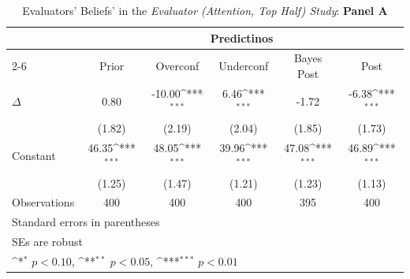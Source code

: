 \begin{table}[htbp]\centering
\def\sym#1{\ifmmode^{#1}\else\(^{#1}\)\fi}
\caption{Evaluators' Beliefs' in the \textit{Evaluator (Attention, Top Half) Study}: \textbf{Panel A}}
\begin{tabular}{l*{5}{c}}
\hline\hline
                &\multicolumn{5}{c}{Predictinos}                                                               \\\cmidrule(lr){2-6}
                &\multicolumn{1}{c}{Prior}&\multicolumn{1}{c}{Overconf}&\multicolumn{1}{c}{Underconf}&\multicolumn{1}{c}{Bayes Post}&\multicolumn{1}{c}{Post}\\
\hline
$\Delta$        &     0.80         &   -10.00\sym{***}&     6.46\sym{***}&    -1.72         &    -6.38\sym{***}\\
                &   (1.82)         &   (2.19)         &   (2.04)         &   (1.85)         &   (1.73)         \\
Constant        &    46.35\sym{***}&    48.05\sym{***}&    39.96\sym{***}&    47.08\sym{***}&    46.89\sym{***}\\
                &   (1.25)         &   (1.47)         &   (1.21)         &   (1.23)         &   (1.13)         \\
\hline
Observations    &      400         &      400         &      400         &      395         &      400         \\
\hline\hline
\multicolumn{6}{l}{\footnotesize Standard errors in parentheses}\\
\multicolumn{6}{l}{\footnotesize SEs are robust}\\
\multicolumn{6}{l}{\footnotesize \sym{*} \(p<0.10\), \sym{**} \(p<0.05\), \sym{***} \(p<0.01\)}\\
\end{tabular}
\end{table}
